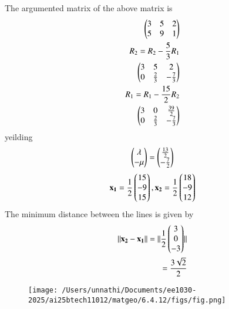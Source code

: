 \documentclass[journal]{IEEEtran}
\begin{document}
The argumented matrix of the above matrix is 
\begin{align}
 \begin{pmatrix}3 & 5 & 2\\5 & 9 & 1\end{pmatrix} \\
 R_2 = R_2 - \frac{5}{3}R_1 \\
 \begin{pmatrix}3 & 5 & 2\\0 & \frac{2}{3} & -\frac{7}{3}\end{pmatrix} \\
R_1 = R_1 - \frac{15}{2}R_2\\
 \begin{pmatrix}3 & 0 & \frac{39}{2}\\0 & \frac{2}{3} & -\frac{7}{3}\end{pmatrix}
 \end{align}
 yeilding 
\begin{align}
    \begin{pmatrix}\lambda \\ -\mu\end{pmatrix} = \begin{pmatrix}\frac{13}{2} \\ -\frac{7}{2}\end{pmatrix}
\end{align}
\begin{align}
    \mathbf{x_1} =\frac{1}{2} \begin{pmatrix}15 \\ -9 \\ 15\end{pmatrix} ,
        \mathbf{x_2} =\frac{1}{2} \begin{pmatrix}18 \\ -9 \\ 12\end{pmatrix}
\end{align}
The minimum distance between the lines is given by
\begin{align}
    \lVert \mathbf{x_2} - \mathbf{x_1} \rVert = \lVert \frac{1}{2}\begin{pmatrix}3 \\ 0 \\ -3\end{pmatrix} \rVert \\
     = \frac{3\sqrt{2}}{2}
\end{align}
\begin{figure}[h!]
   \centering
   \texttt{[image: /Users/unnathi/Documents/ee1030-2025/ai25btech11012/matgeo/6.4.12/figs/fig.png]}
   \caption{}
   \label{stemplot}
\end{figure}
\end{document}
